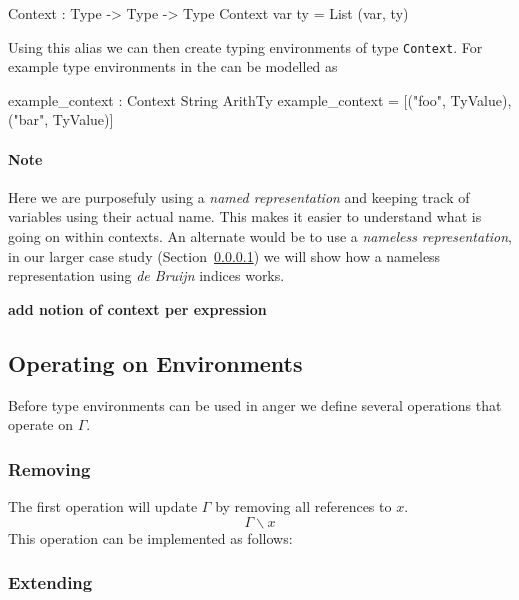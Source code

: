 \begin{code}
Context : Type -> Type -> Type
Context var ty = List (var, ty)
\end{code}

\noindent
Using this alias we can then create typing environments of type \texttt{Context}.
For example type environments in the \allang{} can be modelled as

\begin{code}
example_context : Context String ArithTy
example_context = [("foo", TyValue), ("bar", TyValue)]
\end{code}

\paragraph{Note} Here we are purposefuly using a \emph{named representation} and keeping track of variables using their actual name.
This makes it easier to understand what is going on within contexts.
An alternate would be to use a \emph{nameless representation}, in our larger case study (Section~\ref{}) we will show how a nameless representation using \emph{de Bruijn} indices works.


\begin{center}\bfseries
add notion of context per expression
\end{center}

\subsection{Operating on Environments}
\label{sec:type:env-operations}

Before type environments can be used in anger we define several operations that operate on $\Gamma$.

\subsubsection{Removing}
\label{sec:type:env-operations:remove}

The first operation will update $\Gamma$ by removing all references to $x$.
\[
\Gamma\backslash x
\]
\noindent
This operation can be implemented as follows:

\subsubsection{Extending}
\label{sec:type:env-operations:extend}

